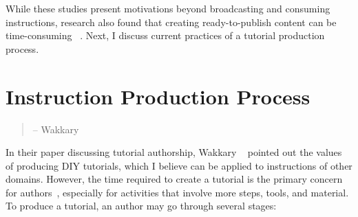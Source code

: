 While these studies present motivations beyond broadcasting and consuming instructions, research also found that creating ready-to-publish content can be time-consuming ~\cite{Kuznetsov:2010:REA:1868914.1868950}. Next, I discuss current practices of a tutorial production process.



\section{Instruction Production Process}
\label{background_creation}

\begin{quote}
 -- Wakkary \ea{}~\cite{Wakkary:2015:TAH:2702123.2702550}
\end{quote}

In their paper discussing tutorial authorship, Wakkary \ea{}~\cite{Wakkary:2015:TAH:2702123.2702550} pointed out the values of producing DIY tutorials, which I believe can be applied to instructions of other domains. However, the time required to create a tutorial is the primary concern for authors~\cite{Kuznetsov:2010:REA:1868914.1868950}, especially for activities that involve more steps, tools, and material. To produce a tutorial, an author may go through several stages:

